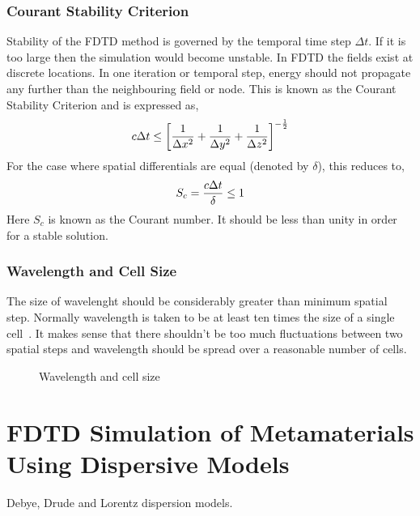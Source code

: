 \documentclass{report}
\begin{document}
\subsection{Courant Stability Criterion}
Stability of the FDTD method is governed by the temporal time step $\Delta t$. If it is too large then the simulation would become unstable. In FDTD the fields exist at discrete locations. In one iteration or temporal step, energy should not propagate any further than the neighbouring field or node. This is known as the Courant Stability Criterion and is expressed as,
\begin{equation}
\centering
c \Delta t \leq \left[ \dfrac{1}{\Delta x^2} + \dfrac{1}{\Delta y^2} + \dfrac{1}{\Delta z^2} \right]^{-\frac{1}{2}}
\label{Courant-Stability-Criterion}
\end{equation}
For the case where spatial differentials are equal (denoted by $\delta$), this reduces to,
\begin{equation}
\centering
S_c = \dfrac{c \Delta t}{\delta} \leq 1
\label{Courant-Stability-Criterion-Equal-Differentials}
\end{equation}
Here $S_c$ is known as the Courant number. It should be less than unity in order for a stable solution.

\subsection{Wavelength and Cell Size}
The size of wavelenght should be considerably greater than minimum spatial step. Normally wavelength is taken to be at least ten times the size of a single cell~\cite{Taflove2000}. It makes sense that there shouldn't be too much fluctuations between two spatial steps and wavelength should be spread over a reasonable number of cells.

\begin{figure}[here]
\centering
{}
\caption{Wavelength and cell size}
\label{Wavelength-Vs-Cell-Size}
\end{figure}

\chapter{FDTD Simulation of Metamaterials Using Dispersive Models}
Debye, Drude and Lorentz dispersion models.
\end{document}
